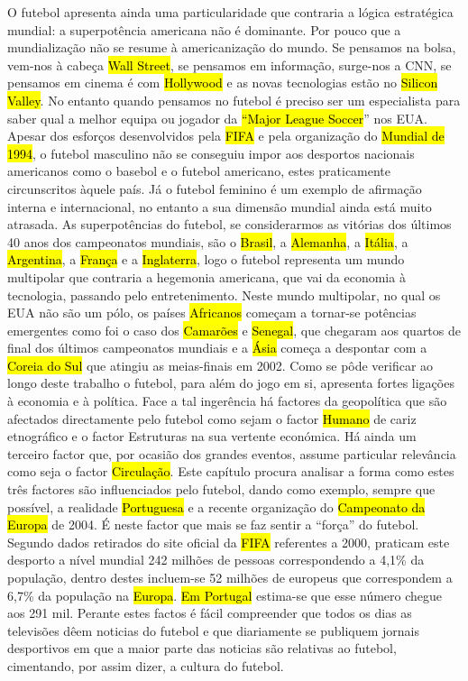 \documentclass[a4paper,12pt]{article}
\begin{document}
 O futebol apresenta ainda uma particularidade que contraria a lógica estratégica mundial: a superpotência americana não é dominante.
 Por pouco que a mundialização não se resume à americanização do mundo. Se pensamos na bolsa, vem-nos à cabeça \hl{Wall Street}, se pensamos em informação, surge-nos a CNN, se pensamos em cinema é com \hl{Hollywood} e as novas tecnologias estão no \hl{Silicon Valley}.
No entanto quando pensamos no futebol é preciso ser um especialista para saber qual a melhor equipa ou jogador da \hl{“Major League Soccer}” nos EUA.
 Apesar dos esforços desenvolvidos pela \hl{FIFA} e pela organização do \hl{Mundial de 1994}, o futebol masculino não se conseguiu impor aos desportos nacionais americanos como o basebol e o futebol americano, estes praticamente circunscritos àquele país. Já o futebol feminino é um exemplo de afirmação interna e internacional, no entanto a sua dimensão mundial ainda está muito atrasada.
 As superpotências do futebol, se considerarmos as vitórias dos últimos 40 anos dos campeonatos mundiais, são o \hl{Brasil}, a \hl{Alemanha}, a \hl{Itália}, a \hl{Argentina}, a \hl{França} e a \hl{Inglaterra}, logo o futebol representa um mundo multipolar que contraria a hegemonia americana, que vai da economia à tecnologia, passando pelo entretenimento. Neste mundo multipolar, no qual os EUA não são um pólo, os países \hl{Africanos} começam a tornar-se potências emergentes como foi o caso dos \hl{Camarões} e \hl{Senegal}, que chegaram aos quartos de final dos últimos campeonatos mundiais e a \hl{Ásia} começa a despontar com a \hl{Coreia do Sul} que atingiu as meias-finais em 2002.
Como se pôde verificar ao longo deste trabalho o futebol, para além do jogo em si, apresenta fortes ligações à economia e à política. Face a tal ingerência há factores da geopolítica que são afectados directamente pelo futebol como sejam o factor \hl{Humano} de
 cariz etnográfico e o factor Estruturas na sua vertente económica. Há ainda um terceiro factor que, por ocasião dos grandes eventos, assume particular relevância como seja o factor \hl{Circulação}. Este capítulo procura analisar a forma como estes três factores são influenciados pelo futebol, dando como exemplo, sempre que possível, a realidade \hl{Portuguesa} e a recente organização do \hl{Campeonato da Europa} de 2004.
 É neste factor que mais se faz sentir a “força” do futebol. Segundo dados retirados do site oficial da \hl{FIFA} referentes a 2000, praticam este desporto a nível mundial 242 milhões de pessoas correspondendo a 4,1\% da população, dentro destes incluem-se 52 milhões de europeus que correspondem a 6,7\% da população na \hl{Europa}. \hl{Em Portugal} estima-se que esse número chegue aos 291 mil. Perante estes factos é fácil compreender que todos os dias as televisões dêem noticias do futebol e que diariamente se publiquem jornais desportivos em que a maior parte das noticias são relativas ao futebol, cimentando, por assim dizer, a cultura do futebol.
\end{document}
